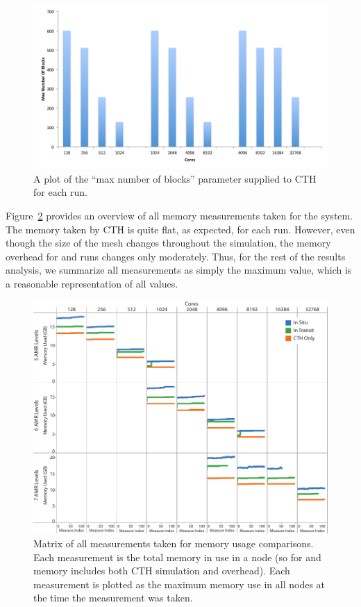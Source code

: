 \begin{figure}[htb]
  \centering
  \includegraphics[width=\linewidth]{figures/MaxNumberOfBlocks}
  \caption{A plot of the ``max number of blocks'' parameter supplied to CTH for each run.}
  \label{fig:MaxBlocks}
\end{figure}

Figure~\ref{fig:MemoryUsageAll} provides an overview of all memory
measurements taken for the system.  The memory taken by CTH is quite flat,
as expected, for each run.  However, even though the size of the mesh
changes throughout the simulation, the memory overhead for \insitu and
\intransit runs changes only moderately.  Thus, for the rest of the results
analysis, we summarize all measurements as simply the maximum value, which
is a reasonable representation of all values.

\begin{figure}[htb]
  \centering
  \includegraphics[width=\linewidth]{figures/MemoryUsageAll}
  \caption{Matrix of all measurements taken for memory usage comparisons.
    Each measurement is the total memory in use in a node (so for \insitu and
    \intransit memory includes both CTH simulation and overhead).  Each
    measurement is plotted as the maximum memory use in all nodes at the
    time the measurement was taken.}
  \label{fig:MemoryUsageAll}
\end{figure}

